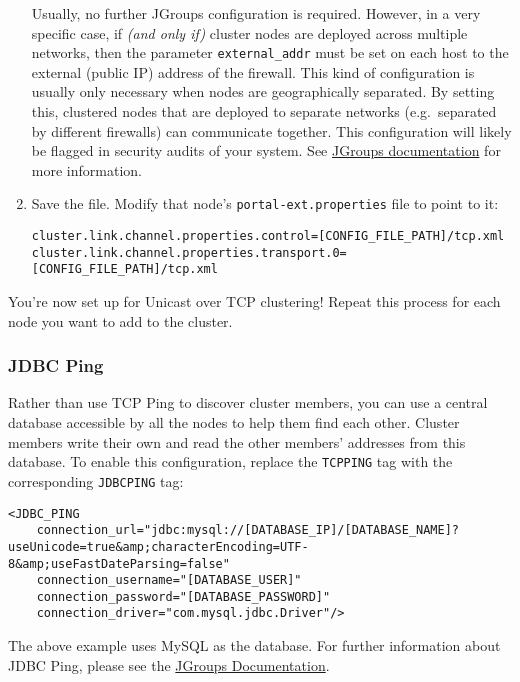\begin{enumerate}
  Usually, no further JGroups configuration is required. However, in a
  very specific case, if \emph{(and only if)} cluster nodes are deployed
  across multiple networks, then the parameter \texttt{external\_addr}
  must be set on each host to the external (public IP) address of the
  firewall. This kind of configuration is usually only necessary when
  nodes are geographically separated. By setting this, clustered nodes
  that are deployed to separate networks (e.g.~separated by different
  firewalls) can communicate together. This configuration will likely be
  flagged in security audits of your system. See
  \href{http://www.jgroups.org/manual-3.x/html/protlist.html\#Transport}{JGroups
  documentation} for more information.
\item
  Save the file. Modify that node's \texttt{portal-ext.properties} file
  to point to it:

\begin{verbatim}
cluster.link.channel.properties.control=[CONFIG_FILE_PATH]/tcp.xml
cluster.link.channel.properties.transport.0=[CONFIG_FILE_PATH]/tcp.xml
\end{verbatim}
\end{enumerate}

You're now set up for Unicast over TCP clustering! Repeat this process
for each node you want to add to the cluster.

\subsubsection{JDBC Ping}\label{jdbc-ping}

Rather than use TCP Ping to discover cluster members, you can use a
central database accessible by all the nodes to help them find each
other. Cluster members write their own and read the other members'
addresses from this database. To enable this configuration, replace the
\texttt{TCPPING} tag with the corresponding \texttt{JDBCPING} tag:

\begin{verbatim}
<JDBC_PING
    connection_url="jdbc:mysql://[DATABASE_IP]/[DATABASE_NAME]?useUnicode=true&amp;characterEncoding=UTF-8&amp;useFastDateParsing=false"
    connection_username="[DATABASE_USER]"
    connection_password="[DATABASE_PASSWORD]"
    connection_driver="com.mysql.jdbc.Driver"/>
\end{verbatim}

The above example uses MySQL as the database. For further information
about JDBC Ping, please see the
\href{http://www.jgroups.org/manual-3.x/html/protlist.html\#DiscoveryProtocols}{JGroups
Documentation}.

